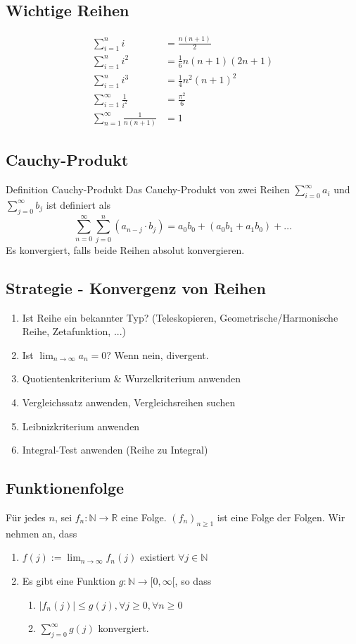 \documentclass[a4paper,fontsize = 7pt]{scrartcl}
\def\limn{\lim_{n\to \infty}}
\def\R{\mathbb{R}}
\def\N{\mathbb{N}}
\begin{document}
\subsection{Wichtige Reihen}
\begin{align*}
 \sum_{i=1}^n i &= \frac{n(n+1)}{2} \\
 \sum_{i=1}^n i^2 &= \frac{1}{6}n(n+1)(2n+1) \\
 \sum_{i=1}^n i^3 &= \frac{1}{4}n^2(n+1)^2 \\
 \sum_{i=1}^\infty \frac{1}{i^2} &= \frac{\pi^2}{6} \\
 \sum_{n=1}^\infty \frac{1}{n(n+1)} &= 1
\end{align*}

\subsection{Cauchy-Produkt}
\begin{subbox}{Definition Cauchy-Produkt}
  \vspace{-4pt}
  Das Cauchy-Produkt von zwei Reihen $\sum_{i = 0}^\infty a_i$ und $\sum_{j = 0}^\infty b_j$ ist definiert als
  $$\sum_{n=0}^\infty \sum_{j=0}^n (a_{n-j} \cdot b_j) = a_0b_0 + (a_0b_1 + a_1b_0) + \ldots$$ 
  Es konvergiert, falls beide Reihen absolut konvergieren.
  \vspace{-4pt}
\end{subbox}

\subsection{Strategie - Konvergenz von Reihen}
\begin{enumerate}
 \item Ist Reihe ein bekannter Typ? (Teleskopieren, Geometrische/Harmonische Reihe, Zetafunktion, ...)
 \item Ist $\limn a_n = 0$? Wenn nein, divergent.
 \item Quotientenkriterium \& Wurzelkriterium anwenden
 \item Vergleichssatz anwenden, Vergleichsreihen suchen
 \item Leibnizkriterium anwenden
 \item Integral-Test anwenden (Reihe zu Integral)
\end{enumerate}

\subsection{Funktionenfolge}
Für jedes $n$, sei $f_n: \N \to \R$ eine Folge. $(f_n)_{n \geq 1}$ ist eine Folge der Folgen. 
Wir nehmen an, dass
\begin{enumerate}
  \item $f(j) := \limn f_n(j)$ existiert $\forall j \in \N$
  \item Es gibt eine Funktion $g: \N \to [0, \infty[$, so dass
  \begin{enumerate}
    \item $|f_n(j)| \leq g(j), \forall j \geq 0,\forall n \geq 0$
    \item $\sum_{j = 0}^{\infty} g(j)$ konvergiert.
  \end{enumerate}
\end{enumerate}
\end{document}
